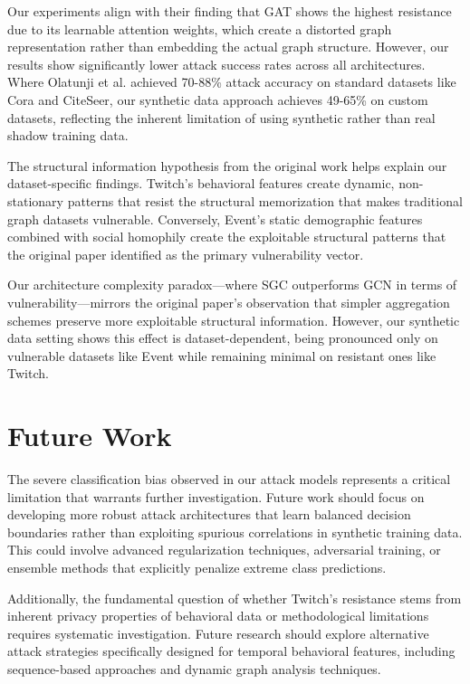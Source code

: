 \documentclass{article}
\begin{document}
Our experiments align with their finding that GAT shows the highest resistance due to its learnable attention weights, which create a distorted graph representation rather than embedding the actual graph structure. However, our results show significantly lower attack success rates across all architectures. Where Olatunji et al. achieved 70-88\% attack accuracy on standard datasets like Cora and CiteSeer, our synthetic data approach achieves 49-65\% on custom datasets, reflecting the inherent limitation of using synthetic rather than real shadow training data.

The structural information hypothesis from the original work helps explain our dataset-specific findings. Twitch's behavioral features create dynamic, non-stationary patterns that resist the structural memorization that makes traditional graph datasets vulnerable. Conversely, Event's static demographic features combined with social homophily create the exploitable structural patterns that the original paper identified as the primary vulnerability vector.

Our architecture complexity paradox—where SGC outperforms GCN in terms of vulnerability—mirrors the original paper's observation that simpler aggregation schemes preserve more exploitable structural information. However, our synthetic data setting shows this effect is dataset-dependent, being pronounced only on vulnerable datasets like Event while remaining minimal on resistant ones like Twitch.

\section{Future Work}

The severe classification bias observed in our attack models represents a critical limitation that warrants further investigation. Future work should focus on developing more robust attack architectures that learn balanced decision boundaries rather than exploiting spurious correlations in synthetic training data. This could involve advanced regularization techniques, adversarial training, or ensemble methods that explicitly penalize extreme class predictions.

Additionally, the fundamental question of whether Twitch's resistance stems from inherent privacy properties of behavioral data or methodological limitations requires systematic investigation. Future research should explore alternative attack strategies specifically designed for temporal behavioral features, including sequence-based approaches and dynamic graph analysis techniques.
\end{document}
